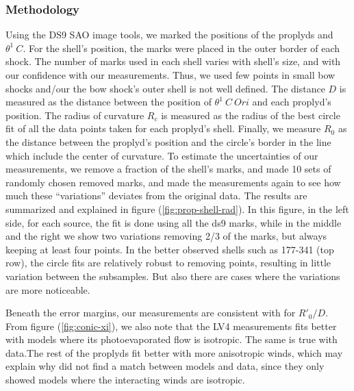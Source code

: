 \subsubsection{Methodology}
Using the DS9 SAO image tools, we marked the positions of the proplyds and $\theta^1 ~C$. For the shell's position, the marks were placed in the outer border of each shock. 
The number of marks used in each shell varies with shell's size, and with our confidence with our measurements.
Thus, we used few points in small bow shocks and/our the bow shock's outer shell is not well defined. The distance $D$ is measured as the distance between the position of $\theta^1 ~C~Ori$ 
and each proplyd's position. The radius of curvature $R_c$ is measured as the radius of the 
best circle fit of all the data points taken for each proplyd's shell. Finally, we measure $R_0$ as the distance between the proplyd's position and the circle's border in the line which 
include the center of curvature.
To estimate the uncertainties of our measurements, we remove a fraction of the shell's marks, and made 10 sets of randomly chosen removed marks, and made the measurements again to 
see how much these ``variations'' deviates from the original data. The results are summarized and explained in figure (\ref{fig:prop-shell-rad}).  In this figure, in the left side, for each source, 
the fit is done using all the ds9 marks, while in the middle and the right we show two variations removing 2/3 of the marks, but always keeping at least four points. 
In the better observed shells such as 177-341 (top row), the circle
fits are relatively robust to removing points, resulting in little variation between the subsamples. 
But also there are cases where the variations are more noticeable.

Beneath the error margins, our measurements are consistent with \citet{Robberto:2005} for $R'_0/D$. From figure (\ref{fig:conic-xi}), we also
note that the LV4 measurements fits better with models where its photoevaporated flow is isotropic. The same is true with \citet{Robberto:2005} data.The rest of the proplyds fit better with more anisotropic winds, which may explain why \citet{Robberto:2005} did not find a match between models
and data, since they only showed models where the interacting winds are isotropic.



